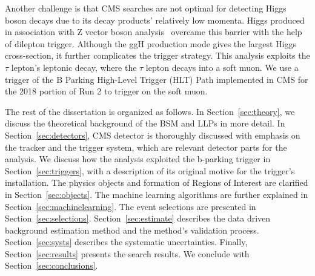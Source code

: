 Another challenge is that CMS searches are not optimal for detecting Higgs boson decays due to its decay products' relatively low momenta.
Higgs produced in association with Z vector boson analysis~\cite{ZHAN} overcame this barrier with the help of dilepton trigger.
Although the ggH production mode gives the largest Higgs cross-section, it further complicates the trigger strategy.
This analysis exploits the $\tau$ lepton's leptonic decay, where the $\tau$ lepton decays into a soft muon.
We use a trigger of the B Parking High-Level Trigger (HLT) Path implemented in CMS for the 2018 portion of Run 2 to trigger on the soft muon.



The rest of the dissertation is organized as follows.
In Section~\ref{sec:theory}, we discuss the theoretical background of the BSM and LLPs in more detail.
In Section~\ref{sec:detectors}, CMS detector is thoroughly discussed with emphasis on the tracker and the trigger system, which are relevant detector parts for the analysis.
We discuss how the analysis exploited the b-parking trigger in Section~\ref{sec:triggers}, with a description of its original motive for the trigger's installation.
The physics objects and formation of Regions of Interest are clarified in Section~\ref{sec:objects}.
The machine learning algorithms are further explained in Section~\ref{sec:machinelearning}.
The event selections are presented in Section~\ref{sec:selections}.
Section~\ref{sec:estimate} describes the data driven background estimation method and the method's validation process.
Section~\ref{sec:systs} describes the systematic uncertainties.
Finally, Section~\ref{sec:results} presents the search results.
We conclude with Section~\ref{sec:conclusions}.




